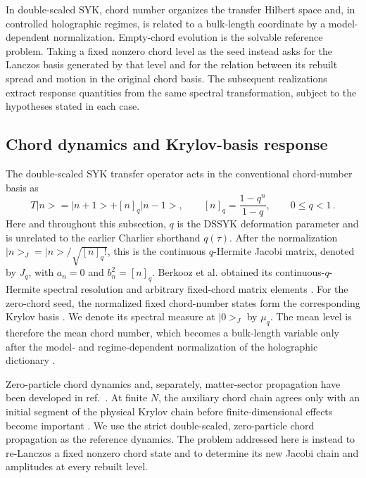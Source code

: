 \documentclass[a4paper,11pt]{article}
\def\ket#1{|#1>}%
\def\Jac{J}%
\theoremstyle{definition}
\theoremstyle{remark}
\newcommand{\ket}[1]{|#1\rangle}
\newcommand{\Jac}{\mathsf J}
\begin{document}
In double-scaled SYK, chord number organizes the transfer Hilbert space and, in controlled
holographic regimes, is related to a bulk-length coordinate by a model-dependent normalization.
Empty-chord evolution is the solvable reference problem.  Taking a fixed nonzero chord level as
the seed instead asks for the Lanczos basis generated by that level and for the relation between
its rebuilt spread and motion in the original chord basis.  The subsequent realizations extract
response quantities from the same spectral transformation, subject to the hypotheses stated in
each case.

\subsection{Chord dynamics and Krylov-basis response}
\label{subsec:chord-context}
\label{subsec:information-context}

The double-scaled SYK transfer operator acts in the conventional chord-number basis as
\cite{Berkooz2019DSSYK}
\begin{equation}
   T\ket n=\ket{n+1}+[n]_q\ket{n-1},
   \qquad
   [n]_q=\frac{1-q^n}{1-q},
   \qquad 0\le q<1\,.
   \label{eq:chord-transfer}
\end{equation}
Here and throughout this subsection, $q$ is the DSSYK deformation parameter and is unrelated
to the earlier Charlier shorthand $q(\tau)$.
After the normalization $\ket n_{\Jac}=\ket n/\sqrt{[n]_q!}$, this is the continuous
$q$-Hermite Jacobi matrix, denoted by $\Jac_q$, with $a_n=0$ and $b_n^2=[n]_q$.
Berkooz et al. obtained its continuous-$q$-Hermite spectral resolution and arbitrary
fixed-chord matrix elements \cite{Berkooz2019DSSYK}.  For the zero-chord seed, the normalized
fixed chord-number states form the corresponding Krylov basis
\cite{RabinoviciEtAl2023BulkKrylov}.  We denote its spectral measure at
$\ket0_{\Jac}$ by $\mu_q$.  The mean level is therefore the mean chord
number, which becomes a bulk-length variable only after the model- and regime-dependent
normalization of the holographic dictionary \cite{Lin2022BulkHilbert}.

Zero-particle chord dynamics and, separately, matter-sector propagation have been developed
in ref.~\cite{Xu2025ChordDynamics}.  At finite $N$, the auxiliary chord chain agrees only with an
initial segment of the physical Krylov chain before finite-dimensional effects become important
\cite{BalasubramanianMaganNandiWu2026}.  We use the strict double-scaled, zero-particle chord
propagation as the reference dynamics.  The problem addressed here is instead to re-Lanczos a
fixed nonzero chord state and to determine its new Jacobi chain and amplitudes at every rebuilt
level.
\end{document}
